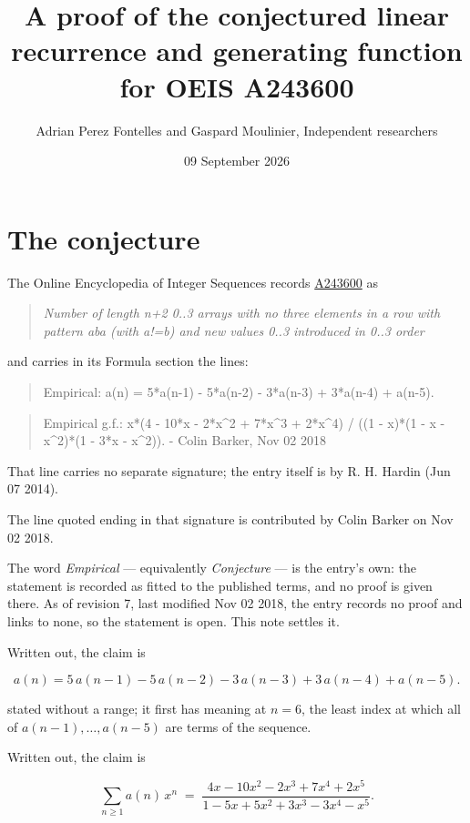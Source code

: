 \documentclass[11pt]{article}
\title{A proof of the conjectured linear recurrence and generating function for OEIS A243600}
\author{Adrian Perez Fontelles and Gaspard Moulinier, Independent researchers}
\date{09 September 2026}
\theoremstyle{definition}
\begin{document}
\maketitle
\section{The conjecture}

The Online Encyclopedia of Integer Sequences records \href{https://oeis.org/A243600}{A243600} as

\begin{quote}\itshape Number of length n+2 0..3 arrays with no three elements in a row with pattern aba (with a!=b) and new values 0..3 introduced in 0..3 order\end{quote}

and carries in its Formula section the lines:

\begin{quote}\ttfamily Empirical: a(n) = 5*a(n-1) - 5*a(n-2) - 3*a(n-3) + 3*a(n-4) + a(n-5).\end{quote}

\begin{quote}\ttfamily Empirical g.f.: x*(4 - 10*x - 2*x\textasciicircum{}2 + 7*x\textasciicircum{}3 + 2*x\textasciicircum{}4) / ((1 - x)*(1 - x - x\textasciicircum{}2)*(1 - 3*x - x\textasciicircum{}2)). - Colin Barker, Nov 02 2018\end{quote}

That line carries no separate signature; the entry itself is by R. H. Hardin (Jun 07 2014).

The line quoted ending in that signature is contributed by Colin Barker on Nov 02 2018.

The word {\itshape Empirical} --- equivalently {\itshape Conjecture} --- is the entry's own: the statement is recorded as fitted to the published terms, and no proof is given there. As of revision 7, last modified Nov 02 2018, the entry records no proof and links to none, so the statement is open. This note settles it.

Written out, the claim is

\[a(n) = 5\,a(n-1) - 5\,a(n-2) - 3\,a(n-3) + 3\,a(n-4) + a(n-5).\]

stated without a range; it first has meaning at $n = 6$, the least index at which all of $a(n-1),\dots,a(n-5)$ are terms of the sequence.

Written out, the claim is

\[\sum_{n \ge 1} a(n)\,x^n \;=\; \frac{4x - 10x^{2} - 2x^{3} + 7x^{4} + 2x^{5}}{1 - 5x + 5x^{2} + 3x^{3} - 3x^{4} - x^{5}}.\]
\end{document}
